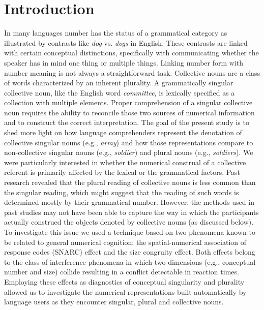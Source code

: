 \documentclass[output=paper{langscibook}
\author{Piotr Gulgowski\affiliation{University of Wrocław} and  Joanna Błaszczak\affiliation{University of Wrocław}}
\title[Conceptual representation of lexical and grammatical number]{Conceptual representation of lexical and grammatical number: Evidence from SNARC and size congruity effect in the processing of Polish nouns}
\begin{document}
\maketitle

\section{Introduction} 
In many languages number has the status of a grammatical category as illustrated by contrasts like \textit{dog} vs. \textit{dogs} in English. These contrasts are linked with certain conceptual distinctions, specifically with communicating whether the speaker has in mind one thing or multiple things. Linking number form with number meaning is not always a straightforward task. Collective nouns are a class of words characterized by an inherent plurality. A grammatically singular collective noun, like the English word \textit{committee}, is lexically specified as a collection with multiple elements. Proper comprehension of a singular collective noun requires the ability to reconcile those two sources of numerical information and to construct the correct interpretation. The goal of the present study is to shed more light on how language comprehenders represent the denotation of collective singular nouns (e.g., \textit{army}) and how those representations compare to non-collective singular nouns (e.g., \textit{soldier}) and plural nouns (e.g., \textit{soldiers}). We were particularly interested in whether the numerical construal of a collective referent is primarily affected by the lexical or the grammatical factors. Past research \citep{bockMeaningSoundSyntax1993,bockNumberAgreementBritish2006,nenonenMismatchesGrammaticalNumber2010} revealed that the plural reading of collective nouns is less common than the singular reading, which might suggest that the reading of such words is determined mostly by their grammatical number. However, the methods used in past studies may not have been able to capture the way in which the participants actually construed the objects denoted by collective nouns (as discussed below). To investigate this issue we used a technique based on two phenomena known to be related to general numerical cognition: the spatial-numerical association of response codes (SNARC) effect and the size congruity effect. Both effects belong to the class of interference phenomena in which two dimensions (e.g., conceptual number and size) collide resulting in a conflict detectable in reaction times. Employing these effects as diagnostics of conceptual singularity and plurality allowed us to investigate the numerical representations built automatically by language users as they encounter singular, plural and collective nouns. 
\end{document}
